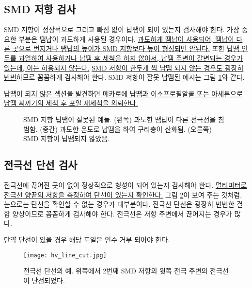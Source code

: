 \subsection{SMD 저항 검사}
SMD 저항이 정상적으로 그리고 빠짐 없이 납땜이 되어 있는지 검사해야 한다. 가장 중요한 부분은 땜납이 과도하게 사용된 경우이다. \uline{과도하게 땜납이 사용되어, 땜납이 다른 곳으로 번지거나 땜납의 높이가 SMD 저항보다 높이 형성되면 안된다.} 또한 \uline{납땜 인두를 과열하여 사용하거나 납땜 후 세척을 하지 않아서, 납땜 주변이 갈변되는 경우가 있는데, 이는 허용되지 않는다.} \uline{SMD 저항이 한두개 씩 납땜 되지 않는 경우도 굉장히 빈번}하므로 꼼꼼하게 검사해야 한다. SMD 저항이 잘못 납땜된 예시는 그림 \ref{fig:bad_solder}와 같다.

\uline{납땜이 되지 않은 섹션을 발견하면 메카로에 납땜과 이소프로필알콜 또는 아세톤으로 납땜 찌꺼기의 세척 후 포일 재세척을 의뢰한다.}

\begin{figure}[htb]
  \centering
  \caption[SMD 저항 납땜이 잘못된 예]{SMD 저항 납땜이 잘못된 예들. (왼쪽) 과도한 땜납이 다른 전극선을 침범함. (중간) 과도한 온도로 납땜을 하여 구리층이 산화됨. (오른쪽) SMD 저항이 납땜되지 않았음.}
  \label{fig:bad_solder}
\end{figure}

\subsection{전극선 단선 검사}
전극선에 끊어진 곳이 없이 정상적으로 형성이 되어 있는지 검사해야 한다. \uline{멀티미터로 전극선 양끝의 저항을 측정하여 단선이 있는지 확인한다.} 그림 \ref{fig:hv_line_cut}이 보여 주는 것처럼, 눈으로는 단선을 확인할 수 없는 경우가 대부분이다. 전극선 단선은 굉장히 빈번한 결합 양상이므로 꼼꼼하게 검사해야 한다. 전극선은 저항 주변에서 끊어지는 경우가 많다.

\uline{만약 단선이 있을 경우 해당 포일은 인수 거부 되어야 한다.}

\begin{figure}[htb]
  \centering
  \texttt{[image: hv\_line\_cut.jpg]}
  \caption[전극선 단선의 예]{전극선 단선의 예. 위쪽에서 2번째 SMD 저항의 윗쪽 전극 주변의 전극선이 단선되었다.}
  \label{fig:hv_line_cut}
\end{figure}

